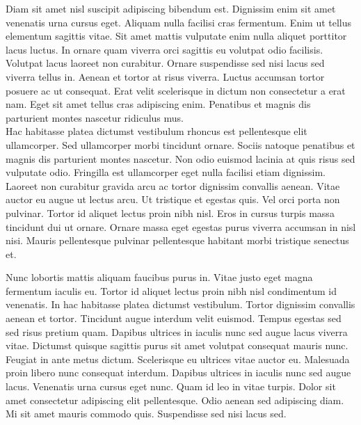 \documentclass{article}
\begin{document}
Diam sit amet nisl suscipit adipiscing bibendum est. Dignissim enim sit amet venenatis urna cursus eget. Aliquam nulla facilisi cras fermentum. Enim ut tellus elementum sagittis vitae. Sit amet mattis vulputate enim nulla aliquet porttitor lacus luctus. In ornare quam viverra orci sagittis eu volutpat odio facilisis. Volutpat lacus laoreet non curabitur. Ornare suspendisse sed nisi lacus sed viverra tellus in. Aenean et tortor at risus viverra. Luctus accumsan tortor posuere ac ut consequat. Erat velit scelerisque in dictum non consectetur a erat nam. Eget sit amet tellus cras adipiscing enim. Penatibus et magnis dis parturient montes nascetur ridiculus mus.
\\
Hac habitasse platea dictumst vestibulum rhoncus est pellentesque elit ullamcorper. Sed ullamcorper morbi tincidunt ornare. Sociis natoque penatibus et magnis dis parturient montes nascetur. Non odio euismod lacinia at quis risus sed vulputate odio. Fringilla est ullamcorper eget nulla facilisi etiam dignissim. Laoreet non curabitur gravida arcu ac tortor dignissim convallis aenean. Vitae auctor eu augue ut lectus arcu. Ut tristique et egestas quis. Vel orci porta non pulvinar. Tortor id aliquet lectus proin nibh nisl. Eros in cursus turpis massa tincidunt dui ut ornare. Ornare massa eget egestas purus viverra accumsan in nisl nisi. Mauris pellentesque pulvinar pellentesque habitant morbi tristique senectus et.

Nunc lobortis mattis aliquam faucibus purus in. Vitae justo eget magna fermentum iaculis eu. Tortor id aliquet lectus proin nibh nisl condimentum id venenatis. In hac habitasse platea dictumst vestibulum. Tortor dignissim convallis aenean et tortor. Tincidunt augue interdum velit euismod. Tempus egestas sed sed risus pretium quam. Dapibus ultrices in iaculis nunc sed augue lacus viverra vitae. Dictumst quisque sagittis purus sit amet volutpat consequat mauris nunc. Feugiat in ante metus dictum. Scelerisque eu ultrices vitae auctor eu. Malesuada proin libero nunc consequat interdum. Dapibus ultrices in iaculis nunc sed augue lacus. Venenatis urna cursus eget nunc. Quam id leo in vitae turpis. Dolor sit amet consectetur adipiscing elit pellentesque. Odio aenean sed adipiscing diam. Mi sit amet mauris commodo quis. Suspendisse sed nisi lacus sed.
\end{document}
